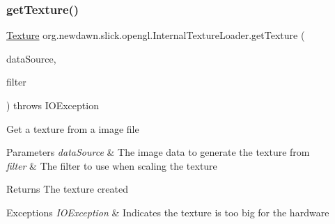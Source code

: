 \subsubsection{\texorpdfstring{get\+Texture()}{getTexture()}\hspace{0.1cm}{\footnotesize\ttfamily [8/8]}}
{\footnotesize\ttfamily \mbox{\hyperlink{interfaceorg_1_1newdawn_1_1slick_1_1opengl_1_1_texture}{Texture}} org.\+newdawn.\+slick.\+opengl.\+Internal\+Texture\+Loader.\+get\+Texture (\begin{DoxyParamCaption}\item[{\mbox{\hyperlink{interfaceorg_1_1newdawn_1_1slick_1_1opengl_1_1_image_data}{Image\+Data}}}]{data\+Source,  }\item[{int}]{filter }\end{DoxyParamCaption}) throws I\+O\+Exception\hspace{0.3cm}{\ttfamily [inline]}}

Get a texture from a image file


\begin{DoxyParams}{Parameters}
{\em data\+Source} & The image data to generate the texture from \\
\hline
{\em filter} & The filter to use when scaling the texture \\
\hline
\end{DoxyParams}
\begin{DoxyReturn}{Returns}
The texture created 
\end{DoxyReturn}

\begin{DoxyExceptions}{Exceptions}
{\em I\+O\+Exception} & Indicates the texture is too big for the hardware \\
\hline
\end{DoxyExceptions}

